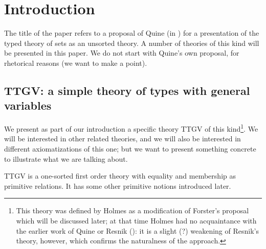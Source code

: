 \documentclass[12pt]{article}
\begin{document}
\newpage

\section{Introduction}

The title of the paper refers to a proposal of Quine (in
\cite{quiettgv}) for a presentation of the typed theory of sets as an
unsorted theory.  A number of theories of this kind will be presented
in this paper.  We do not start with Quine's own proposal, for
rhetorical reasons (we want to make a point).

\subsection{TTGV:  a simple theory of types with general variables}

We present as part of our introduction a specific theory TTGV of this
kind\footnote{This theory was defined by Holmes as a modification of Forster's proposal which will be discussed later; at that time Holmes had no acquaintance with the earlier work of Quine or Resnik (\cite{resnikttgv}):  it is a slight (?) weakening of Resnik's theory, however, which confirms the naturalness of the approach.}.  We will be interested in other related theories, and we will
also be interested in different axiomatizations of this one; but we
want to present something concrete to illustrate what we are talking
about.

TTGV is a one-sorted first order theory with equality and membership as primitive relations.  It has some other primitive notions introduced later.
\end{document}
